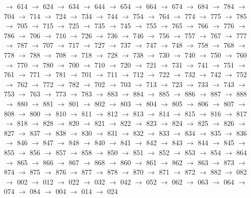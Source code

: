 $\rightarrow$ 614 $\rightarrow$ 624 $\rightarrow$ 634 $\rightarrow$ 644 $\rightarrow$ 654 $\rightarrow$ 664 $\rightarrow$ 674 $\rightarrow$ 684 $\rightarrow$ 784 $\rightarrow$ 704 $\rightarrow$ 714 $\rightarrow$ 724 $\rightarrow$ 734 $\rightarrow$ 744 $\rightarrow$ 754 $\rightarrow$ 764 $\rightarrow$ 774 $\rightarrow$ 775 $\rightarrow$ 785 $\rightarrow$ 705 $\rightarrow$ 715 $\rightarrow$ 725 $\rightarrow$ 735 $\rightarrow$ 745 $\rightarrow$ 755 $\rightarrow$ 765 $\rightarrow$ 766 $\rightarrow$ 776 $\rightarrow$ 786 $\rightarrow$ 706 $\rightarrow$ 716 $\rightarrow$ 726 $\rightarrow$ 736 $\rightarrow$ 746 $\rightarrow$ 756 $\rightarrow$ 757 $\rightarrow$ 767 $\rightarrow$ 777 $\rightarrow$ 787 $\rightarrow$ 707 $\rightarrow$ 717 $\rightarrow$ 727 $\rightarrow$ 737 $\rightarrow$ 747 $\rightarrow$ 748 $\rightarrow$ 758 $\rightarrow$ 768 $\rightarrow$ 778 $\rightarrow$ 788 $\rightarrow$ 708 $\rightarrow$ 718 $\rightarrow$ 728 $\rightarrow$ 738 $\rightarrow$ 730 $\rightarrow$ 740 $\rightarrow$ 750 $\rightarrow$ 760 $\rightarrow$ 770 $\rightarrow$ 780 $\rightarrow$ 700 $\rightarrow$ 710 $\rightarrow$ 720 $\rightarrow$ 721 $\rightarrow$ 731 $\rightarrow$ 741 $\rightarrow$ 751 $\rightarrow$ 761 $\rightarrow$ 771 $\rightarrow$ 781 $\rightarrow$ 701 $\rightarrow$ 711 $\rightarrow$ 712 $\rightarrow$ 722 $\rightarrow$ 732 $\rightarrow$ 742 $\rightarrow$ 752 $\rightarrow$ 762 $\rightarrow$ 772 $\rightarrow$ 782 $\rightarrow$ 702 $\rightarrow$ 703 $\rightarrow$ 713 $\rightarrow$ 723 $\rightarrow$ 733 $\rightarrow$ 743 $\rightarrow$ 753 $\rightarrow$ 763 $\rightarrow$ 773 $\rightarrow$ 783 $\rightarrow$ 883 $\rightarrow$ 884 $\rightarrow$ 885 $\rightarrow$ 886 $\rightarrow$ 887 $\rightarrow$ 888 $\rightarrow$ 880 $\rightarrow$ 881 $\rightarrow$ 801 $\rightarrow$ 802 $\rightarrow$ 803 $\rightarrow$ 804 $\rightarrow$ 805 $\rightarrow$ 806 $\rightarrow$ 807 $\rightarrow$ 808 $\rightarrow$ 800 $\rightarrow$ 810 $\rightarrow$ 811 $\rightarrow$ 812 $\rightarrow$ 813 $\rightarrow$ 814 $\rightarrow$ 815 $\rightarrow$ 816 $\rightarrow$ 817 $\rightarrow$ 818 $\rightarrow$ 828 $\rightarrow$ 820 $\rightarrow$ 821 $\rightarrow$ 822 $\rightarrow$ 823 $\rightarrow$ 824 $\rightarrow$ 825 $\rightarrow$ 826 $\rightarrow$ 827 $\rightarrow$ 837 $\rightarrow$ 838 $\rightarrow$ 830 $\rightarrow$ 831 $\rightarrow$ 832 $\rightarrow$ 833 $\rightarrow$ 834 $\rightarrow$ 835 $\rightarrow$ 836 $\rightarrow$ 846 $\rightarrow$ 847 $\rightarrow$ 848 $\rightarrow$ 840 $\rightarrow$ 841 $\rightarrow$ 842 $\rightarrow$ 843 $\rightarrow$ 844 $\rightarrow$ 845 $\rightarrow$ 855 $\rightarrow$ 856 $\rightarrow$ 857 $\rightarrow$ 858 $\rightarrow$ 850 $\rightarrow$ 851 $\rightarrow$ 852 $\rightarrow$ 853 $\rightarrow$ 854 $\rightarrow$ 864 $\rightarrow$ 865 $\rightarrow$ 866 $\rightarrow$ 867 $\rightarrow$ 868 $\rightarrow$ 860 $\rightarrow$ 861 $\rightarrow$ 862 $\rightarrow$ 863 $\rightarrow$ 873 $\rightarrow$ 874 $\rightarrow$ 875 $\rightarrow$ 876 $\rightarrow$ 877 $\rightarrow$ 878 $\rightarrow$ 870 $\rightarrow$ 871 $\rightarrow$ 872 $\rightarrow$ 882 $\rightarrow$ 082 $\rightarrow$ 002 $\rightarrow$ 012 $\rightarrow$ 022 $\rightarrow$ 032 $\rightarrow$ 042 $\rightarrow$ 052 $\rightarrow$ 062 $\rightarrow$ 063 $\rightarrow$ 064 $\rightarrow$ 074 $\rightarrow$ 084 $\rightarrow$ 004 $\rightarrow$ 014 $\rightarrow$ 024 